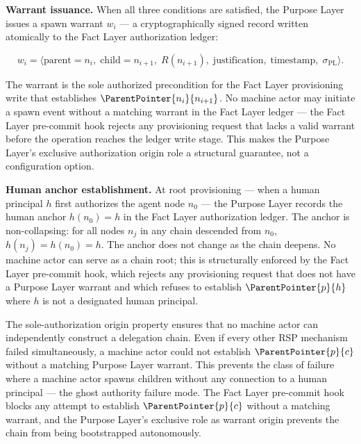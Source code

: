 \medskip
\noindent\textbf{Warrant issuance.} When all three conditions are satisfied, the Purpose Layer issues a spawn warrant $w_i$ --- a cryptographically signed record written atomically to the Fact Layer authorization ledger:

\begin{equation}
w_i = \bigl\langle
\mathrm{parent}=n_i,\;
\mathrm{child}=n_{i+1},\;
R(n_{i+1}),\;
\mathrm{justification},\;
\mathrm{timestamp},\;
\sigma_{\mathrm{PL}}
\bigr\rangle .
\label{eq:spawn-warrant}
\end{equation}

The warrant is the sole authorized precondition for the Fact Layer provisioning write that establishes $\ParentPointer{n_i}{n_{i+1}}$. No machine actor may initiate a spawn event without a matching warrant in the Fact Layer ledger --- the Fact Layer pre-commit hook rejects any provisioning request that lacks a valid warrant before the operation reaches the ledger write stage. This makes the Purpose Layer's exclusive authorization origin role a structural guarantee, not a configuration option.

\medskip
\noindent\textbf{Human anchor establishment.} At root provisioning --- when a human principal $h$ first authorizes the agent node $n_0$ --- the Purpose Layer records the human anchor $h(n_0) = h$ in the Fact Layer authorization ledger. The anchor is non-collapsing: for all nodes $n_j$ in any chain descended from $n_0$, $h(n_j) = h(n_0) = h$. The anchor does not change as the chain deepens. No machine actor can serve as a chain root; this is structurally enforced by the Fact Layer pre-commit hook, which rejects any provisioning request that does not have a Purpose Layer warrant and which refuses to establish $\ParentPointer{p}{h}$ where $h$ is not a designated human principal.

The sole-authorization origin property ensures that no machine actor can independently construct a delegation chain. Even if every other RSP mechanism failed simultaneously, a machine actor could not establish $\ParentPointer{p}{c}$ without a matching Purpose Layer warrant. This prevents the class of failure where a machine actor spawns children without any connection to a human principal --- the ghost authority failure mode. The Fact Layer pre-commit hook blocks any attempt to establish $\ParentPointer{p}{c}$ without a matching warrant, and the Purpose Layer's exclusive role as warrant origin prevents the chain from being bootstrapped autonomously.

